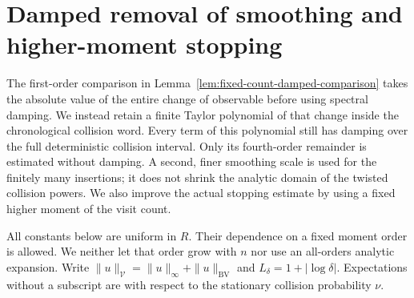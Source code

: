 \section{Damped removal of smoothing and higher-moment stopping}
\label{sec:damped-unsmoothing}
The first-order comparison in
Lemma~\ref{lem:fixed-count-damped-comparison} takes the absolute value
of the entire change of observable before using spectral damping.
We instead retain a finite Taylor polynomial of that change inside
the chronological collision word. Every term of this polynomial
still has damping over the full deterministic collision interval.
Only its fourth-order remainder is estimated without damping.
A second, finer smoothing scale is used for the finitely many
insertions; it does not shrink the analytic domain of the twisted
collision powers. We also improve the actual stopping estimate by
using a fixed higher moment of the visit count.

All constants below are uniform in $R$. Their dependence on a fixed
moment order is allowed. We neither let that order grow with $n$
nor use an all-orders analytic expansion. Write
$\|u\|_{\mathcal V}=\|u\|_\infty+\|u\|_{\mathrm{BV}}$ and
$L_\delta=1+|\log\delta|$. Expectations without a subscript are with
respect to the stationary collision probability $\nu$.

